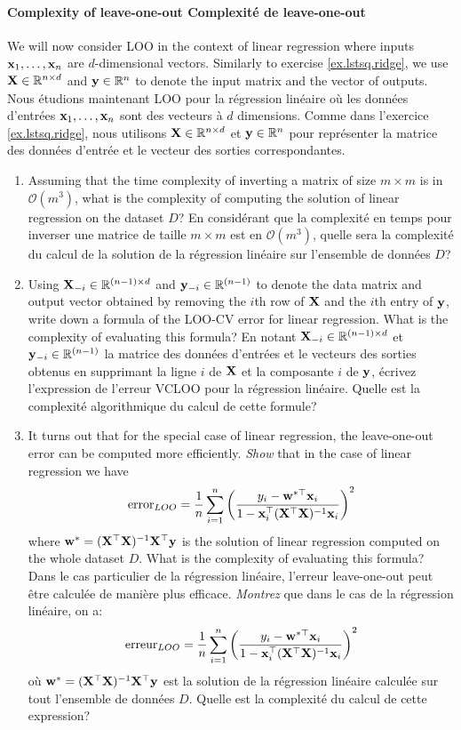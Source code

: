 \documentclass[11pt,french,english]{article}
\newcommand{\french}[1]{ {\color{blue} #1} }
\renewcommand{\vec}[1]{{\bf #1}}
\newcommand{\mat}[1]{{\bf #1}}
\newcommand{\x}{\vec{x}}
\newcommand{\y}{\vec{y}}
\newcommand{\w}{\vec{w}}
\newcommand{\X}{\mat{X}}
\newcommand{\bigo}[1]{\mathcal{O}\left(#1\right)}
\begin{document}
\begin{enumerate}
\paragraph{Complexity of leave-one-out \french{Complexité de leave-one-out}}
We will now consider LOO in the context of linear regression where inputs $\x_1,\dots,\x_n$ are $d$-dimensional vectors. Similarly to exercise \ref{ex.lstsq.ridge}, we use $\X\in\mathbb{R}^{n\times d}$ and $\y\in\mathbb{R}^{n}$ to denote the input matrix and the vector of outputs. \french{Nous étudions maintenant LOO pour la régression linéaire où les données d'entrées $\x_1,\dots,\x_n$ sont des vecteurs à $d$ dimensions. Comme dans l'exercice \ref{ex.lstsq.ridge}, nous utilisons $\X\in\mathbb{R}^{n\times d}$ et $\y\in\mathbb{R}^{n}$ pour représenter la matrice des données d'entrée et le vecteur des sorties correspondantes.}
 \begin{enumerate}[resume]
     \item Assuming that the time complexity of inverting a matrix of size $m\times m$ is in $\bigo{m^3}$, what is the complexity of computing the solution of linear regression on the dataset $D$? \french{En considérant que la complexité en temps pour inverser une matrice de taille $m\times m$ est en $\bigo{m^3}$, quelle sera la complexité du calcul de la solution de la régression linéaire sur l'ensemble de données $D$?}
     \item Using $\X_{-i} \in \mathbb{R}^{(n-1)\times d}$ and $\y_{-i} \in \mathbb{R}^{(n-1)}$ to denote the data matrix and output vector obtained by removing the $i$th row of $\X$ and the $i$th entry of $\y$, write down a formula of the LOO-CV error for linear regression. What is the complexity of evaluating this formula? \french{En notant $\X_{-i} \in \mathbb{R}^{(n-1)\times d}$ et $\y_{-i} \in \mathbb{R}^{(n-1)}$ la matrice des données d'entrées et le vecteurs des sorties obtenus en supprimant la ligne $i$ de $\X$ et la composante $i$ de $\y$, écrivez l'expression de l'erreur VCLOO pour la régression linéaire. Quelle est la complexité algorithmique du calcul de cette formule?}
     \item \iftoggle{undergrad}{{\color{red} [bonus]}}{} It turns out that for the special case of linear regression, the leave-one-out error can be computed more efficiently.  \emph{Show} that in the case of linear regression we have
     $$ \mathrm{error}_{LOO} = \frac{1}{n}\sum_{i=1}^n \left(\frac{y_i - \w^{*\top}\x_i}{1-\x_i^\top(\X^\top\X)^{-1} \x_i}\right)^2$$
     where $\w^*=(\X^\top\X)^{-1}\X^\top\y$ is the solution of linear regression computed on the whole dataset $D$. What is the complexity of evaluating this formula? \french{Dans le cas particulier de la régression linéaire, l'erreur leave-one-out peut être calculée de manière plus efficace.  \emph{Montrez} que dans le cas de la régression linéaire, on a:
     $$ \mathrm{erreur}_{LOO} = \frac{1}{n}\sum_{i=1}^n \left(\frac{y_i - \w^{*\top}\x_i}{1-\x_i^\top(\X^\top\X)^{-1} \x_i}\right)^2$$
     où $\w^*=(\X^\top\X)^{-1}\X^\top\y$ est la solution de la régression linéaire calculée sur tout l'ensemble de données $D$. Quelle est la complexité du calcul de cette expression? }
 \end{enumerate}
 

\end{enumerate}

%
%

%
\end{document}
